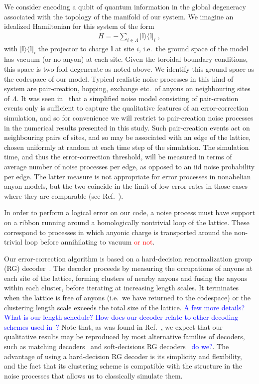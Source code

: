 \documentclass[aps, prl, letterpaper, twocolumn, superscriptaddress, notitlepage, 10pt]{revtex4-1}
\newcommand{\ket}[1]{|{#1}\rangle}
\newcommand{\bra}[1]{\langle{#1}|}
\newcommand{\ketbra}[2]{\ket{#1}\!\bra{#2}}
\newcommand{\proj}[1]{\ketbra{#1}{#1}}
\newcommand{\cggb}[1]{\textcolor{blue}{#1}}
\newcommand{\dude}[1]{\textcolor{red}{#1}}
\begin{document}
We consider encoding a qubit of quantum information in the global degeneracy associated 
with the topology of the manifold of our system. We imagine an idealized Hamiltonian for this 
system of the form
\begin{align}
	H=-\sum_{i\in \Lambda}\proj{\mathbb{I}}_i\;,\label{e:hamiltonian}
\end{align}
with $\proj{\mathbb{I}}_i$ the projector to charge $\mathbb{I}$ at site $i$, i.e.~the ground 
space of the model has vacuum (or no anyon) at each site. Given the toroidal boundary 
conditions, this space is two-fold degenerate as noted above. We identify this ground space 
as the codespace of our model. Typical realistic noise processes in this kind of system are 
pair-creation, hopping, exchange etc.~of anyons on neighbouring sites of $\Lambda$. It was 
seen in~\cite{Brell2013} that a simplified noise model consisting of pair-creation events only 
is sufficient to capture the qualitative features of an error-correction simulation, and so for convenience we 
will restrict to pair-creation noise processes in the numerical results presented in this study. Such pair-creation events act 
on neighbouring pairs of sites, and so may be associated with an edge of the lattice, chosen 
uniformly at random at each time step of the simulation. The simulation time, and thus the 
error-correction threshold, will be measured in terms of average number of noise processes 
per edge, as opposed to an iid noise probability per edge. The latter measure is not 
appropriate for error processes in nonabelian anyon models, but the two coincide in the limit 
of low error rates in those cases where they are comparable (see Ref.~\cite{Brell2013}).

In order to perform a logical error on our code, a noise process must have support on a 
ribbon running around a homologically nontrivial loop of the lattice. These correspond to 
processes in which anyonic charge is transported around the non-trivial loop before 
annihilating to vacuum \dude{or not}.

Our error-correction algorithm is based on a hard-decision renormalization group (RG) 
decoder~\cite{Bravyi2011}. 
The decoder proceeds by measuring the occupations of 
anyons at each site of the lattice, forming clusters of nearby anyons and fusing the anyons 
within each cluster, before iterating at increasing length scales.
It terminates when the lattice 
is free of anyons (i.e.~we have returned to the codespace) or the clustering length scale 
exceeds the total size of the lattice.
\cggb{A few more details? What is our length schedule?} 
\cggb{How does our decoder relate to other decoding schemes used in~\cite{Wootton2013,Brell2013,Hutter2014}?} 
Note that, as was found in Ref.~\cite{Brell2013}, we expect that our qualitative results may be reproduced by most alternative families of decoders, such as matching decoders~\cite{?} and soft-decisions 
RG decoders~\cite{?} \cggb{do we?}.
The advantage of using a hard-decision RG decoder is 
its simplicity and flexibility, and the fact that its clustering scheme is compatible with the structure in the noise processes that allows us to classically simulate them.
\end{document}
